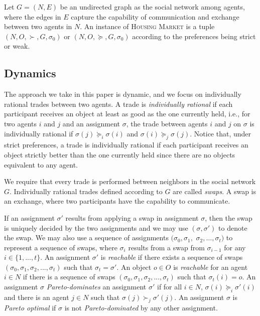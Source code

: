 Let $G=(N,E)$ be an undirected graph as the social network among agents, where the edges in $E$ capture the capability of communication and exchange between two agents in $N$. An instance of \textsc{Housing Market} is a tuple $(N,O,\succ, G, \sigma _0)$ or $(N,O,\succeq, G, \sigma _0)$ according to the preferences being strict or weak.




\subsection{Dynamics}
The approach we take in this paper is dynamic, and we focus on individually rational trades between two agents.
A trade is \emph{individually rational} if each participant receives an object at least as good as the one currently held, i.e., for two agents $i$ and $j$ and an assignment $\sigma$, the trade between agents $i$ and $j$ on $\sigma$ is individually rational if $\sigma(j)\succeq _i \sigma(i)$ and $\sigma(i)\succeq _j \sigma(j)$.
Notice that, under strict preferences, a trade is individually rational if each participant receives an object strictly better than the one currently held since there are no objects equivalent to any agent.

We require that every trade is performed between neighbors in the social network $G$.
Individually rational trades defined according to $G$ are called \emph{swaps}.
A swap is an exchange, where two participants have the capability to communicate.

If an assignment $\sigma'$  results from applying a swap in assignment $\sigma$, then the swap is uniquely decided by the two assignments and we may use $(\sigma, \sigma')$ to denote the swap.
We may also use a sequence of assignments $(\sigma _0,\sigma _1,$
$\sigma _2,\dots,\sigma _t)$ to represent a sequence of swaps, where $\sigma _i$ results from a swap from $\sigma _{i-1}$ for any $i\in \{ 1,...,t\}$.
An assignment $\sigma'$ is \emph{reachable} if there exists a sequence of swaps $(\sigma _0,\sigma _1,\sigma _2,...,\sigma _t)$ such that $\sigma _t=\sigma'$.
An object $o\in O$ is \emph{reachable} for an agent $i\in N$ if there is a sequence of swaps $(\sigma _0,\sigma _1,\sigma _2,...,\sigma _t)$ such that $\sigma _t(i)=o$.
An assignment $\sigma$ \textit{Pareto-dominates} an assignment $\sigma'$ if for all $i\in N$, $\sigma(i)\succeq_i\sigma'(i)$ and there is an agent $j\in N$ such that $\sigma(j)\succ_j\sigma'(j)$.
An assignment $\sigma$ is \textit{Pareto optimal} if $\sigma$ is not \textit{Pareto-dominated} by any other assignment.



